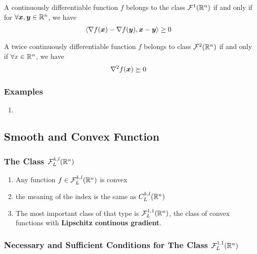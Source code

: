 \begin{theorem}
    A continuously differentiable function $f$ belongs to the class $\mathcal{F}^1(\mathbb{R}^n)$ if and only if for $\forall \bm{x},\bm{y}\in \mathbb{R}^n$, we have
    \begin{align*}
        \braket{\nabla f(\bm{x})-\nabla f(\bm{y}), \bm{x}-\bm{y}}\ge 0
    \end{align*}
\end{theorem}


\begin{theorem}
    A twice continuously  differentiable function $f$ belongs to class $\mathcal{F}^2(\mathbb{R}^n)$ if and only if $\forall x\in \mathbb{R}^n$, we have
    \begin{align*}
        \nabla^2f(\bm{x})\succeq 0
    \end{align*}
\end{theorem}

\subsubsection{Examples}
\begin{enumerate}
    \item 
\end{enumerate}



\subsection{Smooth and Convex Function}
\subsubsection{The Class \texorpdfstring{$\mathcal{F}_L^{k,l}(\mathbb{R}^n)$}.}
\begin{enumerate}
    \item Any function $f\in \mathcal{F}_L^{k,l}(\mathbb{R}^n)$ is convex
    \item the meaning of the index is the same as $C_L^{k,l}(\mathbb{R}^n)$
    \item The most important class of that type is $\mathcal{F}_L^{1,1}(\mathbb{R}^n)$, the class of convex functions with \textbf{Lipschitz continous gradient}. 
\end{enumerate}

\subsubsection{Necessary and Sufficient Conditions for The Class \texorpdfstring{$\mathcal{F}_L^{1,1}(\mathbb{R}^n)$}.}

